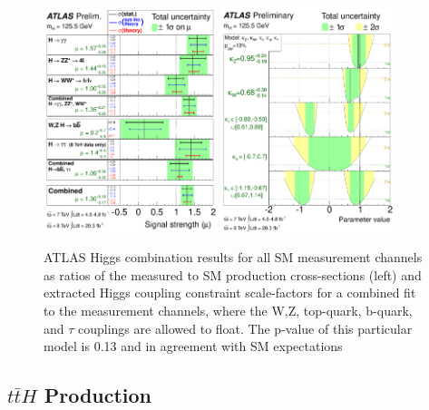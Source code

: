 \begin{figure}[!t]
\centering 
\includegraphics[width=0.45\textwidth]{figs/atlas_higgs.pdf}
\includegraphics[width=0.45\textwidth]{figs/atlas_coupling.pdf}
\caption {
  ATLAS Higgs combination results for all SM measurement channels as ratios of
  the measured to SM production cross-sections (left) and extracted Higgs
  coupling constraint scale-factors for a combined fit to the measurement
  channels, where the W,Z, top-quark, b-quark, and $\tau$ couplings are
  allowed to float. The p-value of this particular model is 0.13 and in agreement
  with SM expectations}

\label{figure:theory_higgsdisc}
\end{figure}


\subsection{$t\bar{t}H$ Production}

